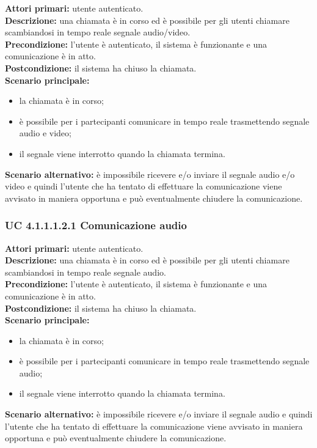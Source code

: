 \noindent
\textbf{Attori primari:} utente autenticato.\\
\textbf{Descrizione:} una chiamata è in corso ed è possibile per gli utenti chiamare scambiandosi in tempo reale segnale audio/video.\\
\textbf{Precondizione:} l'utente è autenticato, il sistema è funzionante e una comunicazione è in atto.\\
\textbf{Postcondizione:} il sistema ha chiuso la chiamata.\\
\textbf{Scenario principale:}
\begin{itemize}
\item la chiamata è in corso;
\item è possibile per i partecipanti comunicare in tempo reale trasmettendo segnale audio e video;
\item il segnale viene interrotto quando la chiamata termina.
\end{itemize}
\textbf{Scenario alternativo:} è impossibile ricevere e/o inviare il segnale audio e/o video e quindi l'utente che ha tentato di effettuare la comunicazione viene avvisato in maniera opportuna e può eventualmente chiudere la comunicazione.

\subsubsection{UC 4.1.1.1.2.1 Comunicazione audio}
\noindent
\textbf{Attori primari:} utente autenticato.\\
\textbf{Descrizione:} una chiamata è in corso ed è possibile per gli utenti chiamare scambiandosi in tempo reale segnale audio.\\
\textbf{Precondizione:} l'utente è autenticato, il sistema è funzionante e una comunicazione è in atto.\\
\textbf{Postcondizione:} il sistema ha chiuso la chiamata.\\
\textbf{Scenario principale:}
\begin{itemize}
\item la chiamata è in corso;
\item è possibile per i partecipanti comunicare in tempo reale trasmettendo segnale audio;
\item il segnale viene interrotto quando la chiamata termina.
\end{itemize}
\textbf{Scenario alternativo:} è impossibile ricevere e/o inviare il segnale audio e quindi l'utente che ha tentato di effettuare la comunicazione viene avvisato in maniera opportuna e può eventualmente chiudere la comunicazione.

